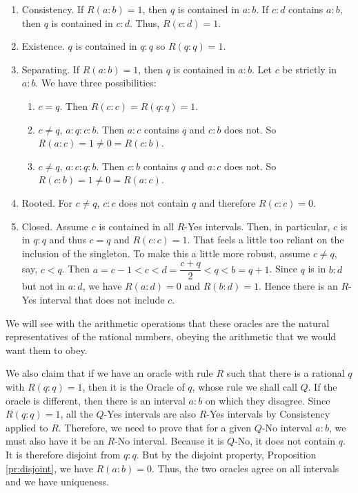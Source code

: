 \documentclass[12pt]{article}
\begin{document}
\begin{enumerate}
    \item Consistency. If $R(a:b)=1$, then $q$ is contained in $a:b$. If $c:d$ contains $a:b$, then $q$ is contained in $c:d$. Thus, $R(c:d)=1$.
    \item Existence. $q$ is contained in $q:q$ so $R(q:q)=1$.
    \item Separating. If $R(a:b) =1$, then $q$ is contained in $a : b$. Let $c$ be strictly in $a:b$. We have three possibilities: 
    \begin{enumerate}
    \item $c=q$. Then $R(c:c) = R(q:q) = 1$.
    \item $c \neq q$, $a : q : c : b$. Then $a:c$ contains $q$ and $c:b$ does not. So $R(a:c)=1 \neq 0 =R(c:b)$.
    \item $c \neq q$, $a : c : q : b$. Then $c:b$ contains $q$ and $a:c$ does not. So $R(c:b)=1 \neq 0 =R(a:c)$.
    \end{enumerate}    
    \item Rooted. For $c \neq q$, $c:c$ does not contain $q$ and therefore $R(c:c)=0$.
    \item Closed. Assume $c$ is contained in all $R$-Yes intervals. Then, in particular, $c$ is in $q:q$ and thus $c=q$ and $R(c:c)=1$. That feels a little too reliant on the inclusion of the singleton. To make this a little more robust, assume $c \neq q$, say, $c < q$. Then  $a=c-1 < c < d=\dfrac{c+q}{2} < q < b=q+1$. Since $q$ is in $b:d$ but not in $a:d$, we have $R(a:d)=0$ and $R(b:d)=1$. Hence there is an $R$-Yes interval that does not include $c$.
\end{enumerate}

We will see with the arithmetic operations that these oracles are the natural representatives of the rational numbers, obeying the arithmetic that we would want them to obey.  

We also claim that if we have an oracle with rule $R$ such that there is a rational $q$ with $R(q:q)=1$, then it is the Oracle of $q$, whose rule we shall call $Q$. If the oracle is different, then there is an interval $a:b$ on which they disagree. Since $R(q:q) =1$, all the  $Q$-Yes intervals are also $R$-Yes intervals by Consistency applied to $R$. Therefore, we need to prove that for a given  $Q$-No interval $a:b$, we must also have it be an $R$-No interval. Because it is $Q$-No, it does not contain $q$. It is therefore disjoint from $q:q$. But by the disjoint property, Proposition \ref{pr:disjoint}, we have $R(a:b)=0$. Thus, the two oracles agree on all intervals and we have uniqueness. 
\end{document}
